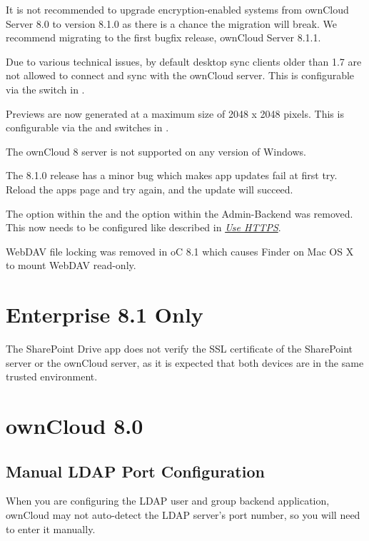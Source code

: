 \documentclass[letterpaper,10pt,english]{sphinxmanual}
\begin{document}
It is not recommended to upgrade encryption-enabled systems from ownCloud Server 8.0
to version 8.1.0 as there is a chance the migration will break. We recommend
migrating to the first bugfix release, ownCloud Server 8.1.1.

Due to various technical issues, by default desktop sync clients older than
1.7 are not allowed to connect and sync with the ownCloud server. This is
configurable via the  switch in
.

Previews are now generated at a maximum size of 2048 x 2048 pixels. This is configurable
via the  and  switches in .

The ownCloud 8 server is not supported on any version of Windows.

The 8.1.0 release has a minor bug which makes app updates fail at first try. Reload the
apps page and try again, and the update will succeed.

The  option within the  and the  option
within the Admin-Backend was removed. This now needs to be configured like
described in {\hyperref[configuration_server/harden_server:use\string-https\string-label]{\emph{Use HTTPS}}}.

WebDAV file locking was removed in oC 8.1 which causes Finder on Mac OS X to mount WebDAV read-only.


\section{Enterprise 8.1 Only}
\label{release_notes:enterprise-8-1-only}
The SharePoint Drive app does not verify the SSL certificate of the SharePoint
server or the ownCloud server, as it is expected that both devices are in the
same trusted environment.


\section{ownCloud 8.0}
\label{release_notes:owncloud-8-0}

\subsection{Manual LDAP Port Configuration}
\label{release_notes:manual-ldap-port-configuration}
When you are configuring the LDAP user and group backend application, ownCloud
may not auto-detect the LDAP server's port number, so you will need to enter it
manually.
\end{document}
